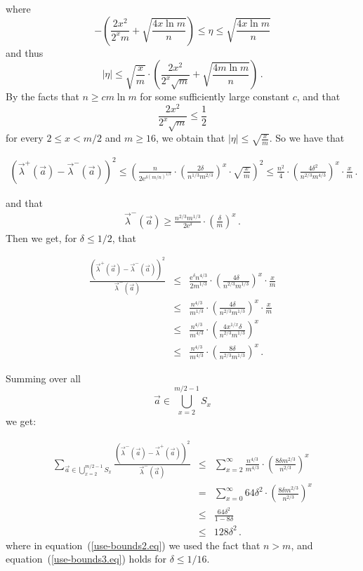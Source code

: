 \documentclass[10pt]{article}
\theoremstyle{definition}
\numberwithin{equation}{section}
\newcommand{\eee}{\mathrm e}  %
\newcommand{\BEQN}{\begin{eqnarray}}\newcommand{\EEQN}{\end{eqnarray}}
\begin{document}
%
where
\[
- \left(\frac{2x^2}{2^xm} + \sqrt{\frac{4x\ln m}{n}}\right) \leq  \eta
\leq \sqrt{\frac{4x\ln m}{n}}
\]
 and thus 
\[
|\eta| \leq \sqrt{\frac{x}{m}} \cdot \left(\frac{2x^2}{2^x\sqrt{m}} +
  \sqrt{\frac{4m\ln m}{n}}\right)\,.
\]
By the facts that
$n \geq cm\ln m$ for some sufficiently large constant $c$, and that
\[
\frac{2x^2}{2^x\sqrt{m}}\leq \frac{1}{2}
\]
for every $2 \leq x < m/2$ and $m\geq 16$, we obtain that $|\eta| \leq \sqrt{\frac{x}{m}}$.
So we have that
%

\begin{eqnarray}
(\vec{\lambda}^+(\vec{a}) - \vec{\lambda}^-(\vec{a}))^2
\leq
 \left(\frac{n}{2\eee^{\delta(m/n)^{1/3}}}
    \cdot\left(\frac{2\delta}{n^{1/3}m^{2/3}}\right)^x\cdot \sqrt{\frac{x}{m}}\right)^2 
\leq
    \frac{n^2}{4}\cdot \left(\frac{4\delta^2}{n^{2/3}m^{4/3}}\right)^x \cdot \frac{x}{m}\,.
\end{eqnarray}










%
and that
\BEQN
\vec{\lambda}^-(\vec{a}) \geq \frac{n^{2/3}m^{1/3}}{2\eee^{\delta}}\cdot\left(\frac{\delta}{m}\right)^x\,.
\EEQN
Then we get, for $\delta \leq 1/2$, that
%

\BEQN
\frac{\left(\vec{\lambda}^+(\vec{a}) - \vec{\lambda}^-(\vec{a})\right)^2}
       {\vec{\lambda}^-(\vec{a})}
&\leq&
  \frac{\eee^{\delta}n^{4/3}}{2m^{1/3}}\cdot
    \left(\frac{4\delta}{n^{2/3}m^{1/3}}\right)^x\cdot
       \frac{x}{m} \\
&\leq& \frac{n^{4/3}}{m^{1/3}}\cdot\left(\frac{4\delta}{n^{2/3}m^{1/3}}\right)^x
     \cdot\frac{x}{m} \\
&\leq& \frac{n^{4/3}}{m^{4/3}}\cdot\left(\frac{4x^{1/x}\delta}{n^{2/3}m^{1/3}}\right)^x\\
&\leq& \frac{n^{4/3}}{m^{4/3}}\cdot\left(\frac{8\delta}{n^{2/3}m^{1/3}}\right)^x\,.
\EEQN













%
Summing over all \[\vec{a}\in \bigcup_{x =2}^{m/2-1} S_x\] we get:
%

\BEQN
\sum_{\vec{a}\in \bigcup_{x=2}^{m/2-1} S_x}
   \frac{(\vec{\lambda}^-(\vec{a}) - \vec{\lambda}^+(\vec{a}))^2}{\vec{\lambda}^-(\vec{a})}
&\leq& \sum_{x=2}^\infty \frac{n^{4/3}}{m^{4/3}}\cdot\left(\frac{8\delta m^{2/3}}{n^{2/3}}\right)^x \\
&=& \sum_{x=0}^\infty 64\delta^2\cdot\left(\frac{8\delta m^{2/3}}{n^{2/3}}\right)^x
          \label{use-bounds2.eq}\\
&\leq& \frac{64\delta^2}{1-8\delta} \\ &\leq& 128\delta^2\,.\label{use-bounds3.eq}
\EEQN
where in equation~(\ref{use-bounds2.eq}) we used the fact that
$n > m$, and equation~(\ref{use-bounds3.eq}) holds for $\delta \leq 1/16$.
\end{document}
